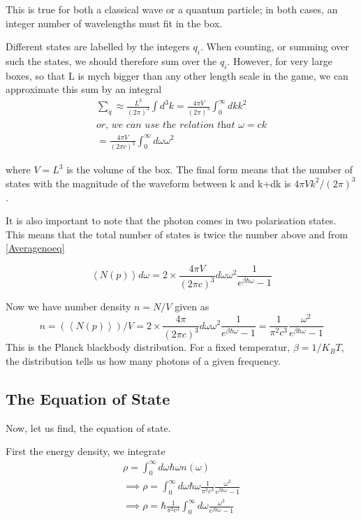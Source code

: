 \documentclass[12pt]{report}
\newcommand{\tit}[1]{\textit{#1}}
\begin{document}
This is true for both a classical wave or a quantum particle; in both cases, an integer number of wavelengths must fit in the box. 

Different states are labelled by the integers $q_i$. When counting, or summing over such the states, we should therefore sum over the $q_i$. However, for very large boxes, so that L is mych bigger than any other length scale in the game, we can approximate this sum by an integral
\begin{eqnarray}
\sum_q \approx \frac{L^3}{(2 \pi)^3} \int d^3k= \frac{4 \pi V}{(2 \pi)^3}\int^\infty _0 dk k^2 \\
\tit{or, we can use the relation that $\omega=ck$}\\
=\frac{4 \pi V}{(2 \pi c)^3}\int^\infty_0 d \omega \omega^2
\end{eqnarray}

where $V=L^3$ is the volume of the box. The final form means that the number of states with the magnitude of the waveform between k and k+dk is $4 \pi V k^2/(2 \pi)^3$.

It is also important to note that the photon comes in two polarisation states. This means that the total number of states is twice the number above and from \eqref{Averagenoeq} 

\begin{equation}
\left\langle N(p)\right\rangle d\omega = 2 \times \frac{4 \pi V}{(2 \pi c)^3} d \omega \omega^2 \frac{1}{e^{\beta \hbar \omega} - 1}
\end{equation}

Now we have number density $n=N/V$ given as
\begin{equation}
n=(\left\langle N(p)\right\rangle)/V = 2 \times \frac{4 \pi }{(2 \pi c)^3} d \omega \omega^2 \frac{1}{e^{\beta \hbar \omega} - 1}= \frac{1}{\pi^2 c^3}\frac{\omega^2}{e^{\beta \hbar \omega}-1}
\end{equation}
This is the Planck blackbody distribution. For a fixed temperatur, $\beta = 1/K_BT$, the distribution tells us how many photons of a given frequency.
\subsection*{The Equation of State}
Now, let us find, the equation of state.

First the energy density, we integrate
\begin{eqnarray*}
\rho = \int^\infty_0 d\omega \hbar \omega n(\omega)\\
\implies \rho = \int^\infty_0 d\omega \hbar \omega \frac{1}{\pi^2 c^3}\frac{\omega^2}{e^{\beta \hbar \omega}-1}\\
\implies \rho = \hbar  \frac{1}{\pi^2 c^3} \int^\infty_0 d\omega \frac{\omega^3}{e^{\beta \hbar \omega}-1}
\end{eqnarray*} 
\end{document}
